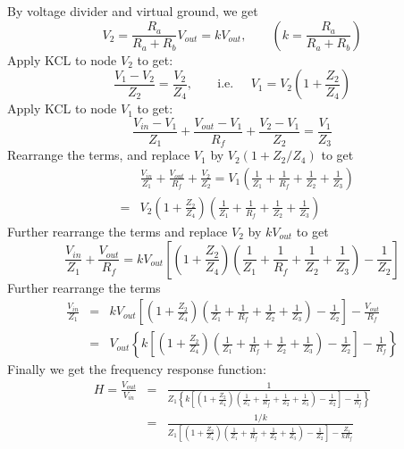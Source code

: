 \documentclass{article}
\begin{document}
\begin{itemize}
  By voltage divider and virtual ground, we get
  \begin{equation}
  V_2=\frac{R_a}{R_a+R_b}V_{out}=kV_{out},\;\;\;\;\;\;\;\left(k=\frac{R_a}{R_a+R_b}\right)
  \end{equation}
  Apply KCL to node $V_2$ to get:
  \begin{equation}
    \frac{V_1-V_2}{Z_2}=\frac{V_2}{Z_4},\;\;\;\;\;\;\;\mbox{i.e.}\;\;\;\;\;
    V_1=V_2\left(1+\frac{Z_2}{Z_4}\right)
  \end{equation}
  Apply KCL to node $V_1$ to get:
  \begin{equation}
    \frac{V_{in}-V_1}{Z_1}+\frac{V_{out}-V_1}{R_f}+\frac{V_2-V_1}{Z_2}
    =\frac{V_1}{Z_3}
  \end{equation}
  Rearrange the terms, and replace $V_1$ by $V_2(1+Z_2/Z_4)$ to get
  \begin{eqnarray}
    &&\frac{V_{in}}{Z_1}+\frac{V_{out}}{R_f}+\frac{V_2}{Z_2}
    =V_1\left(\frac{1}{Z_1}+\frac{1}{R_f}+\frac{1}{Z_2}+\frac{1}{Z_3}\right)
    \nonumber\\
    &=&V_2\left(1+\frac{Z_2}{Z_4}\right)\left(\frac{1}{Z_1}
    +\frac{1}{R_f}+\frac{1}{Z_2}+\frac{1}{Z_3}\right)
  \end{eqnarray}
  Further rearrange the terms and replace $V_2$ by $kV_{out}$ to get
  \begin{equation}
  \frac{V_{in}}{Z_1}+\frac{V_{out}}{R_f}
  =kV_{out}\left[\left(1+\frac{Z_2}{Z_4}\right)\left(\frac{1}{Z_1}+\frac{1}{R_f}
    +\frac{1}{Z_2}+\frac{1}{Z_3}\right)-\frac{1}{Z_2}\right]
  \end{equation}
  Further rearrange the terms
  \begin{eqnarray}
    \frac{V_{in}}{Z_1}&=&kV_{out}\left[\left(1+\frac{Z_2}{Z_4}\right)
\left(\frac{1}{Z_1}
      +\frac{1}{R_f}+\frac{1}{Z_2}+\frac{1}{Z_3}\right)-\frac{1}{Z_2}\right]-\frac{V_{out}}{R_f}
    \nonumber \\
    &=&
    V_{out}\left\{k\left[\left(1+\frac{Z_2}{Z_4}\right)\left(\frac{1}{Z_1}
      +\frac{1}{R_f}+\frac{1}{Z_2}+\frac{1}{Z_3}\right)-\frac{1}{Z_2}\right]-\frac{1}{R_f}\right\}
  \end{eqnarray}
  Finally we get the frequency response function:
  \begin{eqnarray}
    H=\frac{V_{out}}{V_{in}}&=&
    \frac{1}{Z_1\left\{k\left[\left(1+\frac{Z_2}{Z_4}\right)\left(\frac{1}{Z_1}+\frac{1}{R_f}+\frac{1}{Z_2}+\frac{1}{Z_3}\right)-\frac{1}{Z_2}\right]-\frac{1}{R_f}\right\}}
    \nonumber \\
    &=&
    \frac{1/k}{Z_1\left[\left(1+\frac{Z_2}{Z_4}\right)\left(\frac{1}{Z_1}+\frac{1}{R_f}+\frac{1}{Z_2}+\frac{1}{Z_3}\right)-\frac{1}{Z_2}\right]-\frac{Z_1}{kR_f}}

\end{eqnarray}
\end{itemize}
\end{document}

